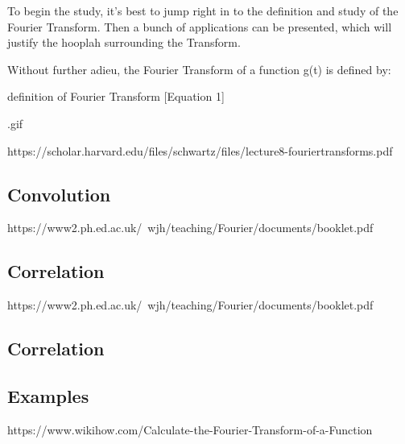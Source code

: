 \documentclass[ams,fleqn,amsmath,amssymb]{article}
\begin{document}
\begin{}
To begin the study, it's best to jump right in to the definition and study of the Fourier Transform. Then a bunch of applications can be presented, which will justify the hooplah surrounding the Transform.

Without further adieu, the Fourier Transform of a function g(t) is defined by:

definition of Fourier Transform
[Equation 1]

\fourierDefinition.gif

https://scholar.harvard.edu/files/schwartz/files/lecture8-fouriertransforms.pdf

\subsection*{Convolution}
https://www2.ph.ed.ac.uk/~wjh/teaching/Fourier/documents/booklet.pdf
\subsection*{Correlation}
https://www2.ph.ed.ac.uk/~wjh/teaching/Fourier/documents/booklet.pdf
\subsection*{Correlation}
\subsection*{Examples}
https://www.wikihow.com/Calculate-the-Fourier-Transform-of-a-Function
\end{}
\end{document}
